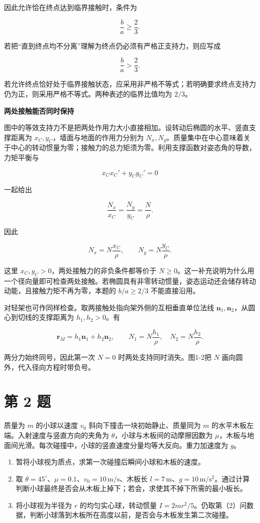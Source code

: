 \documentclass[12pt,a4paper,UTF8]{ctexart}
\newcommand{\tightlist}{\setlength{\itemsep}{0pt}\setlength{\parskip}{0pt}}
\begin{document}
因此允许恰在终点达到临界接触时，条件为

\[\boxed{\frac ba\geq\frac23}.\]

若把``直到终点均不分离''理解为终点仍必须有严格正支持力，则应写成

\[\boxed{\frac ba>\frac23}.\]

若允许终点恰好处于临界接触状态，应采用非严格不等式；若明确要求终点支持力仍为正，则采用严格不等式。两种表述的临界比值均为
\(2/3\)。

\textbf{两处接触能否同时保持}

图中的等效支持力不是把两处作用力大小直接相加。设转动后椭圆的水平、竖直支撑距离为
\(x_C,y_C\)，墙面与地面的作用力分别为
\(N_x,N_y\)。质量集中在中心意味着关于中心的转动惯量为零；接触力的总力矩须为零。利用支撑函数对姿态角的导数，力矩平衡与

\[x_Cx_C'+y_Cy_C'=0\]

一起给出

\[\frac{N_x}{x_C}=\frac{N_y}{y_C}=\frac N\rho.\]

因此

\[N_x=N\frac{x_C}{\rho},\qquad N_y=N\frac{y_C}{\rho}.\]

这里 \(x_C,y_C>0\)，两处接触力的非负条件都等价于
\(N\ge0\)。这一补充说明为什么用一个径向量即可检查两处接触。若椭圆具有非零转动惯量，姿态运动还会储存转动动能，且接触力矩不再为零，本题的
\(b/a\ge2/3\) 不能直接沿用。

对轻架也可作同样检查。取两接触处指向架外侧的互相垂直单位法线
\(\bm n_1,\bm n_2\)，从圆心到切线的支撑距离为 \(h_1,h_2>0\)。有

\[\bm r_M=h_1\bm n_1+h_2\bm n_2,\qquad
N_1=N\frac{h_1}{\rho},\quad N_2=N\frac{h_2}{\rho}.\]

两分力始终同号，因此第一次 \(N=0\) 时两处支持同时消失。图1-2把 \(N\)
画向圆外，代入径向方程时带负号。

\newpage

\section{第 2 题}\label{ux7b2c-2-ux9898}

质量为 \(m\) 的小球以速度 \(v_0\) 斜向下撞击一块初始静止、质量同为 \(m\)
的水平木板左端。入射速度与竖直方向的夹角为
\(\theta\)，小球与木板间的动摩擦因数为
\(\mu\)，木板与地面间光滑。每次碰撞中，小球的竖直速度分量均等大反向。重力加速度为
\(g\)。

\begin{enumerate}
\def\labelenumi{\arabic{enumi}.}
\tightlist
\item
  暂将小球视为质点，求第一次碰撞后瞬间小球和木板的速度。
\item
  取 \(\theta=45^\circ\)、\(\mu=0.1\)、\(v_0=10\,\mathrm{m/s}\)、木板长
  \(l=7\,\mathrm m\)、\(g=10\,\mathrm{m/s^2}\)。通过计算判断小球最终是否会从木板上掉下；若会，求使其不掉下所需的最小板长。
\item
  将小球视为半径为 \(r\) 的均匀实心球，转动惯量
  \(I=2mr^2/5\)。仍取第（2）问数据，判断小球落到木板所在高度以前，是否会与木板发生第二次碰撞。
\end{enumerate}
\end{document}

